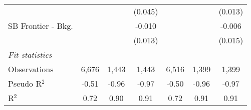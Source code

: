 \begin{tabular}{lcccccc}
                                &                &         & (0.045)       &                &         & (0.013)\\   
   SB Frontier - Bkg.           &                &         & -0.010        &                &         & -0.006\\   
                                &                &         & (0.013)       &                &         & (0.015)\\   
   \midrule
   \emph{Fit statistics}\\
   Observations                 & 6,676          & 1,443   & 1,443         & 6,516          & 1,399   & 1,399\\  
   Pseudo R$^2$                 & -0.51          & -0.96   & -0.97         & -0.50          & -0.96   & -0.97\\  
   R$^2$                        & 0.72           & 0.90    & 0.91          & 0.72           & 0.91    & 0.91\\  
   

\end{tabular}
